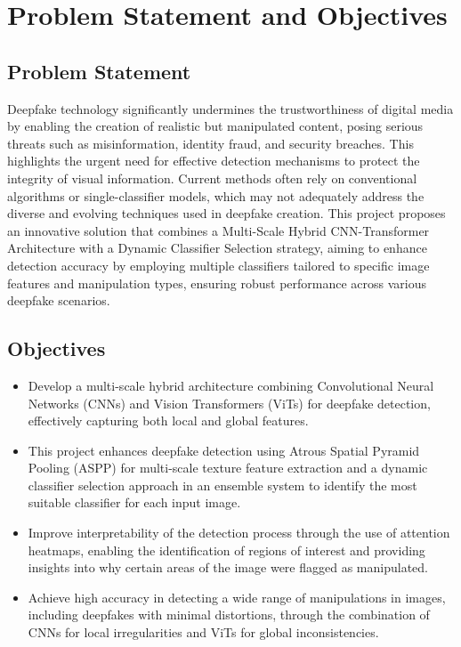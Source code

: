 \section{Problem Statement and Objectives }
\subsection*{Problem Statement}
Deepfake technology significantly undermines the trustworthiness of digital media by enabling the creation of realistic but manipulated content, posing serious threats such as misinformation, identity fraud, and security breaches. This highlights the urgent need for effective detection mechanisms to protect the integrity of visual information. Current methods often rely on conventional algorithms or single-classifier models, which may not adequately address the diverse and evolving techniques used in deepfake creation. This project proposes an innovative solution that combines a Multi-Scale Hybrid CNN-Transformer Architecture with a Dynamic Classifier Selection strategy, aiming to enhance detection accuracy by employing multiple classifiers tailored to specific image features and manipulation types, ensuring robust performance across various deepfake scenarios.

\subsection*{Objectives}
\begin{itemize}
    \item Develop a multi-scale hybrid architecture combining Convolutional Neural Networks (CNNs) and Vision Transformers (ViTs) for deepfake detection, effectively capturing both local and global features.
    \item This project enhances deepfake detection using Atrous Spatial Pyramid Pooling (ASPP) for multi-scale texture feature extraction and a dynamic classifier selection approach in an ensemble system to identify the most suitable classifier for each input image.
    \item Improve interpretability of the detection process through the use of attention heatmaps, enabling the identification of regions of interest and providing insights into why certain areas of the image were flagged as manipulated.
    \item Achieve high accuracy in detecting a wide range of manipulations in images, including deepfakes with minimal distortions, through the combination of CNNs for local irregularities and ViTs for global inconsistencies.
\end{itemize}


